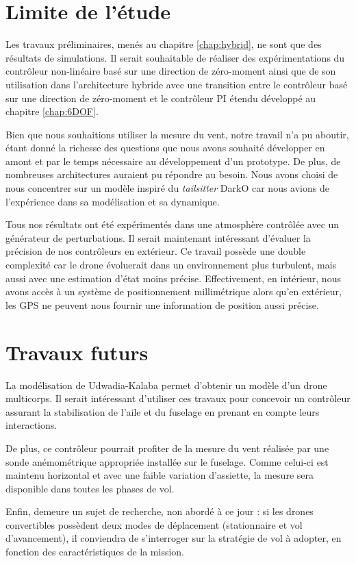 \section*{Limite de l'étude}
Les travaux préliminaires, menés au chapitre \ref{chap:hybrid}, ne sont que des résultats de simulations. Il serait souhaitable de réaliser des expérimentations du contrôleur non-linéaire basé sur une direction de zéro-moment ainsi que de son utilisation dans l'architecture hybride avec une transition entre le contrôleur basé sur une direction de zéro-moment et le contrôleur PI étendu développé au chapitre \ref{chap:6DOF}.

Bien que nous souhaitions utiliser la mesure du vent, notre travail n'a pu aboutir, étant donné la richesse des questions que nous avons souhaité développer en amont et par le temps nécessaire au développement d'un prototype.
De plus, de nombreuses architectures auraient pu répondre au besoin. Nous avons choisi de nous concentrer sur un modèle inspiré du \textit{tailsitter} DarkO car nous avions de l'expérience dans sa modélisation et sa dynamique.

Tous nos résultats ont été expérimentés dans une atmosphère contrôlée avec un générateur de perturbations. Il serait maintenant intéressant d'évaluer la précision de nos contrôleurs en extérieur. Ce travail possède une double complexité car le drone évoluerait dans un environnement plus turbulent, mais aussi avec une estimation d'état moins précise. Effectivement, en intérieur, nous avons accès à un système de positionnement millimétrique alors qu'en extérieur, les GPS ne peuvent nous fournir une information de position aussi précise.


\section*{Travaux futurs}

La modélisation de Udwadia-Kalaba permet d'obtenir un modèle d'un drone multicorps. Il serait intéressant d'utiliser ces travaux pour concevoir un contrôleur assurant la stabilisation de l'aile et du fuselage en prenant en compte leurs interactions.

De plus, ce contrôleur pourrait profiter de la mesure du vent réalisée par une sonde anémométrique appropriée installée sur le fuselage. Comme celui-ci est maintenu horizontal et avec une faible variation d'assiette, la mesure sera disponible dans toutes les phases de vol.

Enfin, demeure un sujet de recherche, non abordé à ce jour : si les drones convertibles possèdent deux modes de déplacement (stationnaire et vol d'avancement), il conviendra de s'interroger sur la stratégie de vol à adopter, en fonction des caractéristiques de la mission.

